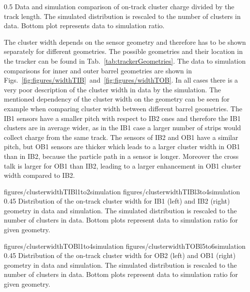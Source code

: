 
                 {0.5}       %
                 { Data and simulation comparison of on-track cluster charge divided by the track length. The simulated distribution is rescaled to the number of clusters in data. Bottom plot represents data to simulation ratio. }

The cluster width depends on the sensor geometry and therefore has to be shown separately for different geometries. The possible geometries and their location in the tracker can be found in Tab.~\ref{tab:trackerGeometries}. The data to simulation comparisons for inner and outer barrel geometries are shown in Figs.~\ref{fig:figures/widthTIB}~and~\ref{fig:figures/widthTOB}. In all cases there is a very poor description of the cluster width in data by the simulation. The mentioned dependency of the cluster width on the geometry can be seen for example when comparing cluster width between different barrel geometries. The IB1 sensors have a smaller pitch with respect to IB2 ones and therefore the IB1 clusters are in average wider, as in the IB1 case a larger number of strips would collect charge from the same track. The sensors of IB2 and OB1 have a similar pitch, but OB1 sensors are thicker which leads to a larger cluster width in OB1 than in IB2, because the particle path in a sensor is longer. Moreover the cross talk is larger for OB1 than IB2, leading to a larger enhancement in OB1 cluster width compared to IB2.


                 {figures/clusterwidthTIBl1to2simulation}
                 {figures/clusterwidthTIBl3to4simulation} %
                 {0.45}       %
                 { Distribution of the on-track cluster width for IB1 (left) and IB2 (right) geometry in data and simulation. The simulated distribution is rescaled to the number of clusters in data. Bottom plots represent data to simulation ratio for given geometry. }

                 {figures/clusterwidthTOBl1to4simulation}
                 {figures/clusterwidthTOBl5to6simulation} %
                 {0.45}       %
                 { Distribution of the on-track cluster width for OB2 (left) and OB1 (right) geometry in data and simulation. The simulated distribution is rescaled to the number of clusters in data. Bottom plots represent data to simulation ratio for given geometry. }


